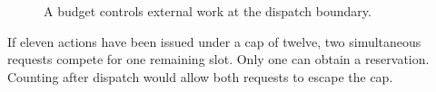 \begin{figure}[H]
\centering
{}
\caption{A budget controls external work at the dispatch boundary.}\label{fig:teach-M06-12}
\end{figure}

If eleven actions have been issued under a cap of twelve, two simultaneous requests compete for one remaining slot. Only one can obtain a reservation. Counting after dispatch would allow both requests to escape the cap.

